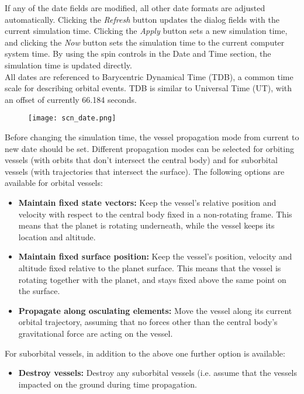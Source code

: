 \documentclass[Orbiter User Manual.tex]{subfiles}
\begin{document}
\noindent
If any of the date fields are modified, all other date formats are adjusted automatically. Clicking the \textit{Refresh} button updates the dialog fields with the current simulation time. Clicking the \textit{Apply} button sets a new simulation time, and clicking the \textit{Now} button sets the simulation time to the current computer system time. By using the spin controls in the Date and Time section, the simulation time is updated directly.\\
All dates are referenced to Barycentric Dynamical Time (TDB), a common time scale for describing orbital events. TDB is similar to Universal Time (UT), with an offset of currently 66.184 seconds.

\begin{figure}[H]
	\centering
	\texttt{[image: scn\_date.png]}
\end{figure}

\noindent
Before changing the simulation time, the vessel propagation mode from current to new date should be set. Different propagation modes can be selected for orbiting vessels (with orbits that don't intersect the central body) and for suborbital vessels (with trajectories that intersect the surface). The following options are available for orbital vessels:

\begin{itemize}
\item \textbf{Maintain fixed state vectors:} Keep the vessel's relative position and velocity with respect to the central body fixed in a non-rotating frame. This means that the planet is rotating underneath, while the vessel keeps its location and altitude.
\item \textbf{Maintain fixed surface position:} Keep the vessel's position, velocity and altitude fixed relative to the planet surface. This means that the vessel is rotating together with the planet, and stays fixed above the same point on the surface.
\item \textbf{Propagate along osculating elements:} Move the vessel along its current orbital trajectory, assuming that no forces other than the central body's gravitational force are acting on the vessel.
\end{itemize}

\noindent
For suborbital vessels, in addition to the above one further option is available:

\begin{itemize}
\item \textbf{Destroy vessels:} Destroy any suborbital vessels (i.e. assume that the vessels impacted on the ground during time propagation.
\end{itemize}
\end{document}

